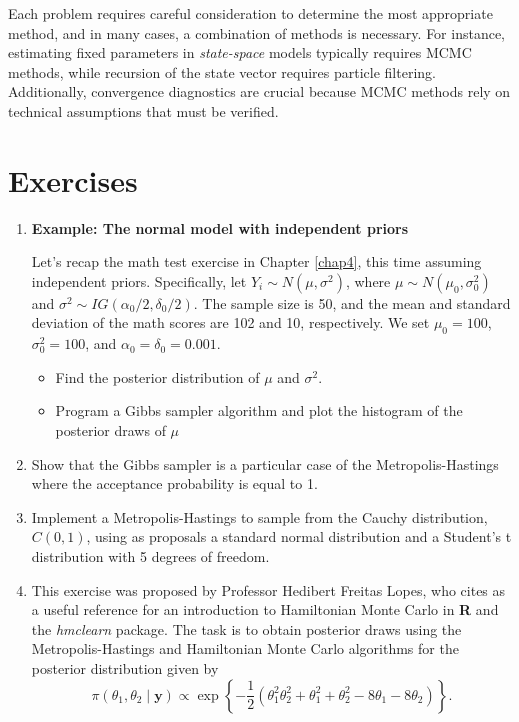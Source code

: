 Each problem requires careful consideration to determine the most appropriate method, and in many cases, a combination of methods is necessary. For instance, estimating fixed parameters in \textit{state-space} models typically requires MCMC methods, while recursion of the state vector requires particle filtering. Additionally, convergence diagnostics are crucial because MCMC methods rely on technical assumptions that must be verified.

\section{Exercises}\label{sec56}

\begin{enumerate}
	\item \textbf{Example: The normal model with independent priors}
	
	Let's recap the math test exercise in Chapter \ref{chap4}, this time assuming independent priors. Specifically, let $Y_i \sim N(\mu, \sigma^2)$, where $\mu \sim N(\mu_0, \sigma_0^2)$ and $\sigma^2 \sim IG(\alpha_0 / 2, \delta_0 / 2)$. The sample size is 50, and the mean and standard deviation of the math scores are 102 and 10, respectively. We set $\mu_0 = 100$, $\sigma_0^2 = 100$, and $\alpha_0 = \delta_0 = 0.001$.
	
	\begin{itemize}
		\item Find the posterior distribution of $\mu$ and $\sigma^2$.
		\item Program a Gibbs sampler algorithm and plot the histogram of the posterior draws of $\mu$
	\end{itemize}

	\item Show that the Gibbs sampler is a particular case of the Metropolis-Hastings where the acceptance probability is equal to 1.
	
	\item Implement a Metropolis-Hastings to sample from the Cauchy distribution, $C(0,1)$, using as proposals a standard normal distribution and a Student's t distribution with 5 degrees of freedom.
	
	\item This exercise was proposed by Professor Hedibert Freitas Lopes, who cites \cite{thomas2021learning} as a useful reference for an introduction to Hamiltonian Monte Carlo in \textbf{R} and the \textit{hmclearn} package. The task is to obtain posterior draws using the Metropolis-Hastings and Hamiltonian Monte Carlo algorithms for the posterior distribution given by 
	\[
	\pi(\theta_1,\theta_2\mid \bm{y}) \propto \exp\left\{-\frac{1}{2}(\theta_1^2\theta_2^2 + \theta_1^2 + \theta_2^2 - 8\theta_1 - 8\theta_2)\right\}.
	\]
	

\end{enumerate}
